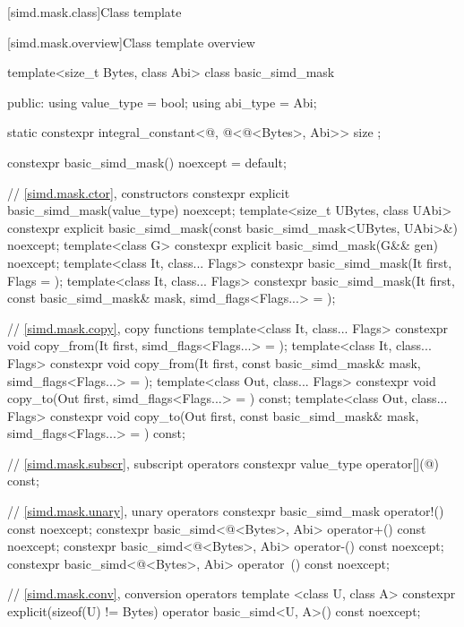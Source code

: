 [simd.mask.class]{Class template }

[simd.mask.overview]{Class template  overview}

\begin{codeblock}
template<size_t Bytes, class Abi> class basic_simd_mask {
public:
  using value_type = bool;
  using abi_type = Abi;

  static constexpr integral_constant<@\simdsizetype@, @\simdsizev@<@\integerfrom@<Bytes>, Abi>> size {};

  constexpr basic_simd_mask() noexcept = default;

  // \ref{simd.mask.ctor},  constructors
  constexpr explicit basic_simd_mask(value_type) noexcept;
  template<size_t UBytes, class UAbi>
    constexpr explicit basic_simd_mask(const basic_simd_mask<UBytes, UAbi>&) noexcept;
  template<class G> constexpr explicit basic_simd_mask(G&& gen) noexcept;
  template<class It, class... Flags>
    constexpr basic_simd_mask(It first, Flags = {});
  template<class It, class... Flags>
    constexpr basic_simd_mask(It first, const basic_simd_mask& mask, simd_flags<Flags...> = {});

  // \ref{simd.mask.copy},  copy functions
  template<class It, class... Flags>
    constexpr void copy_from(It first, simd_flags<Flags...> = {});
  template<class It, class... Flags>
    constexpr void copy_from(It first, const basic_simd_mask& mask, simd_flags<Flags...> = {});
  template<class Out, class... Flags>
    constexpr void copy_to(Out first, simd_flags<Flags...> = {}) const;
  template<class Out, class... Flags>
    constexpr void copy_to(Out first, const basic_simd_mask& mask, simd_flags<Flags...> = {}) const;

  // \ref{simd.mask.subscr},  subscript operators
  constexpr value_type operator[](@\simdsizetype@) const;

  // \ref{simd.mask.unary},  unary operators
  constexpr basic_simd_mask operator!() const noexcept;
  constexpr basic_simd<@\integerfrom@<Bytes>, Abi> operator+() const noexcept;
  constexpr basic_simd<@\integerfrom@<Bytes>, Abi> operator-() const noexcept;
  constexpr basic_simd<@\integerfrom@<Bytes>, Abi> operator~() const noexcept;

  // \ref{simd.mask.conv},  conversion operators
  template <class U, class A>
    constexpr explicit(sizeof(U) != Bytes) operator basic_simd<U, A>() const noexcept;

}
\end{codeblock}
